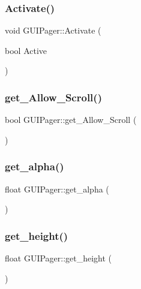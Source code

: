 \subsubsection{\texorpdfstring{Activate()}{Activate()}}
{\footnotesize\ttfamily void G\+U\+I\+Pager\+::\+Activate (\begin{DoxyParamCaption}\item[{bool}]{Active }\end{DoxyParamCaption})}

\hypertarget{class_g_u_i_pager_a1e70fb22eacdf2e8a59c1b79e987e838}{}\label{class_g_u_i_pager_a1e70fb22eacdf2e8a59c1b79e987e838} 
\subsubsection{\texorpdfstring{get\+\_\+\+Allow\+\_\+\+Scroll()}{get\_Allow\_Scroll()}}
{\footnotesize\ttfamily bool G\+U\+I\+Pager\+::get\+\_\+\+Allow\+\_\+\+Scroll (\begin{DoxyParamCaption}{ }\end{DoxyParamCaption})}

\hypertarget{class_g_u_i_pager_afb573705e3d178d0aad836df382bc01d}{}\label{class_g_u_i_pager_afb573705e3d178d0aad836df382bc01d} 
\subsubsection{\texorpdfstring{get\+\_\+alpha()}{get\_alpha()}}
{\footnotesize\ttfamily float G\+U\+I\+Pager\+::get\+\_\+alpha (\begin{DoxyParamCaption}{ }\end{DoxyParamCaption})}

\hypertarget{class_g_u_i_pager_ab10f1d7e35fa9454660cb14ecb28b235}{}\label{class_g_u_i_pager_ab10f1d7e35fa9454660cb14ecb28b235} 
\subsubsection{\texorpdfstring{get\+\_\+height()}{get\_height()}}
{\footnotesize\ttfamily float G\+U\+I\+Pager\+::get\+\_\+height (\begin{DoxyParamCaption}{ }\end{DoxyParamCaption})}

